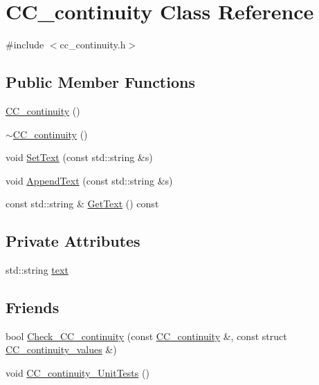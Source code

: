 \hypertarget{a00027}{\section{C\-C\-\_\-continuity Class Reference}
\label{a00027}
}


{\ttfamily \#include $<$cc\-\_\-continuity.\-h$>$}

\subsection*{Public Member Functions}
\begin{DoxyCompactItemize}
\item 
\hyperlink{a00027_afa0aca56563b833b298b667a76d9315b}{C\-C\-\_\-continuity} ()
\item 
\hyperlink{a00027_a8576a67b4911b90fd5afdba1758a9b0f}{$\sim$\-C\-C\-\_\-continuity} ()
\item 
void \hyperlink{a00027_a78c9ab90849f26ee2e5d83de10fc2a0c}{Set\-Text} (const std\-::string \&s)
\item 
void \hyperlink{a00027_a33de69f358d44142b9a62951f0d6c4bb}{Append\-Text} (const std\-::string \&s)
\item 
const std\-::string \& \hyperlink{a00027_a9ce5e3a542e765aa259cf57d374fa46b}{Get\-Text} () const 
\end{DoxyCompactItemize}
\subsection*{Private Attributes}
\begin{DoxyCompactItemize}
\item 
std\-::string \hyperlink{a00027_a7b5d41e8b0aa73c2d8423a7bd27b27fa}{text}
\end{DoxyCompactItemize}
\subsection*{Friends}
\begin{DoxyCompactItemize}
\item 
bool \hyperlink{a00027_ac961436b35c4fb9e497123dcea1a21e6}{Check\-\_\-\-C\-C\-\_\-continuity} (const \hyperlink{a00027}{C\-C\-\_\-continuity} \&, const struct \hyperlink{a00028}{C\-C\-\_\-continuity\-\_\-values} \&)
\item 
void \hyperlink{a00027_a8daadaacfcc6d54a48f7853fe864bc46}{C\-C\-\_\-continuity\-\_\-\-Unit\-Tests} ()
\end{DoxyCompactItemize}



